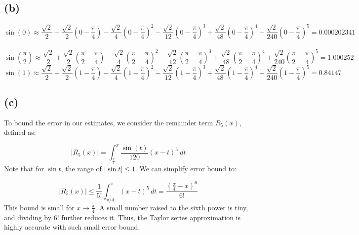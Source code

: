 \documentclass{article}
\begin{document}
\subsection*{(b)}
\[ \sin(0) \approx \frac{\sqrt{2}}{2} + \frac{\sqrt{2}}{2}\left(0 - \frac{\pi}{4}\right) - \frac{\sqrt{2}}{4}\left(0 - \frac{\pi}{4}\right)^2 - \frac{\sqrt{2}}{12}\left(0 - \frac{\pi}{4}\right)^3 + \frac{\sqrt{2}}{48}\left(0 - \frac{\pi}{4}\right)^4 + \frac{\sqrt{2}}{240}\left(0 - \frac{\pi}{4}\right)^5 = 0.000202341 \]\
\[ \sin(\frac{\pi}{2}) \approx \frac{\sqrt{2}}{2} + \frac{\sqrt{2}}{2}\left(\frac{\pi}{2} - \frac{\pi}{4}\right) - \frac{\sqrt{2}}{4}\left(\frac{\pi}{2} - \frac{\pi}{4}\right)^2 - \frac{\sqrt{2}}{12}\left(\frac{\pi}{2} - \frac{\pi}{4}\right)^3 + \frac{\sqrt{2}}{48}\left(\frac{\pi}{2} - \frac{\pi}{4}\right)^4 + \frac{\sqrt{2}}{240}\left(\frac{\pi}{2} - \frac{\pi}{4}\right)^5 = 1.000252 \]
\[ \sin(1) \approx \frac{\sqrt{2}}{2} + \frac{\sqrt{2}}{2}\left(1 - \frac{\pi}{4}\right) - \frac{\sqrt{2}}{4}\left(1 - \frac{\pi}{4}\right)^2 - \frac{\sqrt{2}}{12}\left(1 - \frac{\pi}{4}\right)^3 + \frac{\sqrt{2}}{48}\left(1 - \frac{\pi}{4}\right)^4 + \frac{\sqrt{2}}{240}\left(1 - \frac{\pi}{4}\right)^5 = 0.84147 \]

\subsection*{(c)}
To bound the error in our estimates, we consider the remainder term \( R_5(x) \), defined as:

\[
    |R_5(x)| = \int_{\frac{\pi}{4}}^x \frac{\sin(t)}{120} (x - t)^5 \ dt
\]
Note that for \( \sin t \), the range of $|\sin t| \leq 1$. We can simplify error bound to:

\[
    |R_5(x)| \leq \frac{1}{5!} \int_{\pi/4}^{x} (x - t)^5 \, dt = \frac{(\frac{\pi}{4} - x)^6}{6!}
\]
This bound is small for \( x \rightarrow \frac{\pi}{4} \). A small number raised to the sixth power is tiny, and dividing by \( 6! \) further reduces it. Thus, the Taylor series approximation is highly accurate with such small error bound.
\end{document}
